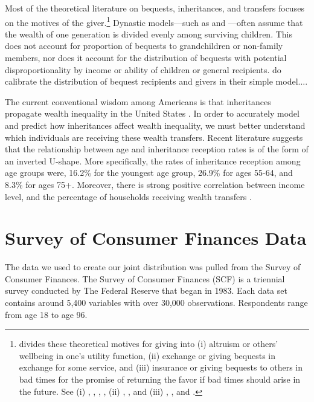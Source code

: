 \documentclass[letterpaper,12pt]{article}
\theoremstyle{definition}
\begin{document}
\begin{spacing}{1.5}
  Most of the theoretical literature on bequests, inheritances, and transfers focuses on the motives of the giver.\footnote{\citet{Wolff:2015} divides these theoretical motives for giving into (i) altruism or others' wellbeing in one's utility function, (ii) exchange or giving bequests in exchange for some service, and (iii) insurance or giving bequests to others in bad times for the promise of returning the favor if bad times should arise in the future. See (i) \citet{Barro:1974}, \citet{Becker:1974}, \citet{BeckerTomes:1979}, \citet{Tomes:1981}, (ii) \citet{BernheimEtAl:1985}, \citet{Cox:1987}, and (iii) \citet{Cox:1990}, \citet{CoxJappelli:1990}, and \citet{Kochar:1997}.} Dynastic models---such as \citet{GokhaleEtAl:2001} and \citet{FarhiWerning:2010}---often assume that the wealth of one generation is divided evenly among surviving children. This does not account for proportion of bequests to grandchildren or non-family members, nor does it account for the distribution of bequests with potential disproportionality by income or ability of children or general recipients. \citet{PikettySaez:2013} do calibrate the distribution of bequest recipients and givers in their simple model....

  The current conventional wisdom among Americans is that inheritances propagate wealth inequality in the United States \citet{Wolff:2015}. In order to accurately model and predict how inheritances affect wealth inequality, we must better understand which individuals are receiving these wealth transfers. Recent literature suggests that the relationship between age and inheritance reception rates is of the form of an inverted U-shape. More specifically, the rates of inheritance reception among age groups were, 16.2\% for the youngest age group, 26.9\% for ages 55-64, and 8.3\% for ages 75+. Moreover, there is strong positive correlation between income level, and the percentage of households receiving wealth transfers \citet{Wolff:2015}.


\section{Survey of Consumer Finances Data}\label{SecSCFdata}

The data we used to create our joint distribution was pulled from the Survey of Consumer Finances. The Survey of Consumer Finances (SCF) is a triennial survey conducted by The Federal Reserve that began in 1983. Each data set contains around 5,400 variables with over 30,000 observations. Respondents range from age 18 to age 96. 


\end{spacing}
\end{document}
